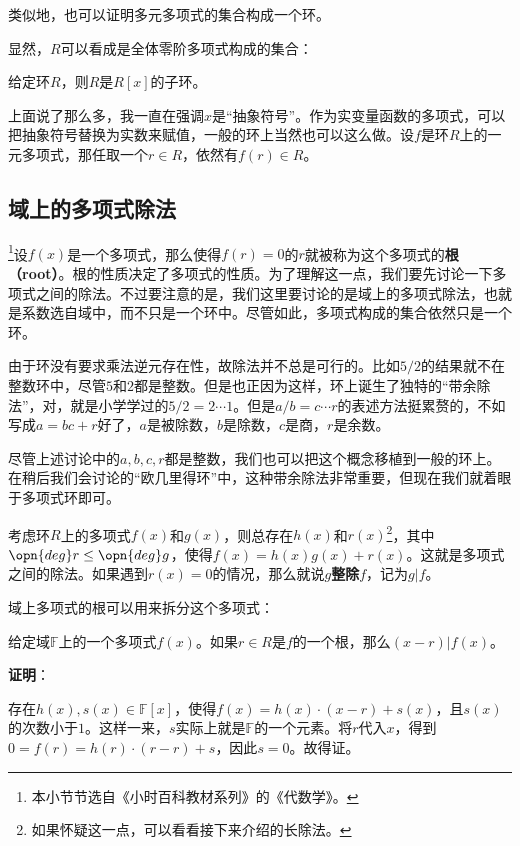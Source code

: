 类似地，也可以证明多元多项式的集合构成一个环。


显然，$R$可以看成是全体零阶多项式构成的集合：

\begin{exercise}{}
给定环$R$，则$R$是$R[x]$的子环。
\end{exercise}






上面说了那么多，我一直在强调$x$是“抽象符号”。作为实变量函数的多项式，可以把抽象符号替换为实数来赋值，一般的环上当然也可以这么做。设$f$是环$R$上的一元多项式，那任取一个$r\in R$，依然有$f(r)\in R$。




\subsection{域上的多项式除法}

\footnote{本小节节选自《小时百科教材系列》的《代数学》。}设$f(x)$是一个多项式，那么使得$f(r)=0$的$r$就被称为这个多项式的\textbf{根（root）}。根的性质决定了多项式的性质。为了理解这一点，我们要先讨论一下多项式之间的除法。不过要注意的是，我们这里要讨论的是域上的多项式除法，也就是系数选自域中，而不只是一个环中。尽管如此，多项式构成的集合依然只是一个环。

由于环没有要求乘法逆元存在性，故除法并不总是可行的。比如$5/2$的结果就不在整数环中，尽管$5$和$2$都是整数。但是也正因为这样，环上诞生了独特的“带余除法”，对，就是小学学过的$5/2=2\cdots 1$。但是$a/b=c\cdots r$的表述方法挺累赘的，不如写成$a=bc+r$好了，$a$是被除数，$b$是除数，$c$是商，$r$是余数。

尽管上述讨论中的$a, b, c, r$都是整数，我们也可以把这个概念移植到一般的环上。在稍后我们会讨论的“欧几里得环”中，这种带余除法非常重要，但现在我们就着眼于多项式环即可。

考虑环$R$上的多项式$f(x)$和$g(x)$，则总存在$h(x)$和$r(x)$\footnote{如果怀疑这一点，可以看看接下来介绍的长除法。}，其中$\opn{deg}r\leq\opn{deg}g$，使得$f(x)=h(x)g(x)+r(x)$。这就是多项式之间的除法。如果遇到$r(x)=0$的情况，那么就说$g$\textbf{整除}$f$，记为$g|f$。

域上多项式的根可以用来拆分这个多项式：

\begin{theorem}{}\label{the_RPlynm_1}
给定域$\mathbb{F}$上的一个多项式$f(x)$。如果$r\in R$是$f$的一个根，那么$(x-r)|f(x)$。
\end{theorem}

\textbf{证明}：

存在$h(x), s(x)\in\mathbb{F}[x]$，使得$f(x)=h(x)\cdot(x-r)+s(x)$，且$s(x)$的次数小于$1$。这样一来，$s$实际上就是$\mathbb{F}$的一个元素。将$r$代入$x$，得到$0=f(r)=h(r)\cdot(r-r)+s$，因此$s=0$。故得证。

